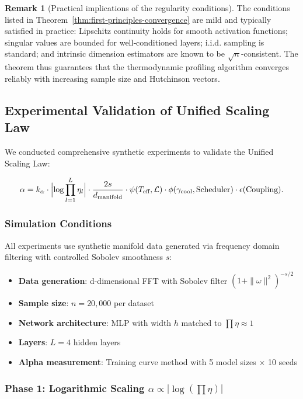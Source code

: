 \documentclass[11pt, a4paper]{article}
\theoremstyle{definition}
\newtheorem{remark}{Remark}[section]
\begin{document}
\begin{remark}[Practical implications of the regularity conditions]
The conditions listed in Theorem~\ref{thm:first-principles-convergence} are mild and typically satisfied in practice: Lipschitz continuity holds for smooth activation functions; singular values are bounded for well‑conditioned layers; i.i.d. sampling is standard; and intrinsic dimension estimators are known to be $\sqrt{n}$‑consistent. The theorem thus guarantees that the thermodynamic profiling algorithm converges reliably with increasing sample size and Hutchinson vectors.
\end{remark}


\subsection{Experimental Validation of Unified Scaling Law}

We conducted comprehensive synthetic experiments to validate the Unified Scaling Law:

\begin{equation}
\alpha = k_\alpha \cdot \Bigl|\log\prod_{l=1}^{L}\eta_l\Bigr| \cdot \frac{2s}{d_{\text{manifold}}} \cdot \psi(T_{\text{eff}},\mathcal{L}) \cdot \phi(\gamma_{\text{cool}},\text{Scheduler}) \cdot \epsilon(\text{Coupling}).
\end{equation}

\subsubsection{Simulation Conditions}

All experiments use synthetic manifold data generated via frequency domain filtering with controlled Sobolev smoothness $s$:
\begin{itemize}
    \item \textbf{Data generation}: d-dimensional FFT with Sobolev filter $(1 + \|\omega\|^2)^{-s/2}$
    \item \textbf{Sample size}: $n = 20{,}000$ per dataset
    \item \textbf{Network architecture}: MLP with width $h$ matched to $\prod\eta \approx 1$
    \item \textbf{Layers}: $L = 4$ hidden layers
    \item \textbf{Alpha measurement}: Training curve method with 5 model sizes $\times$ 10 seeds
\end{itemize}

\subsubsection{Phase 1: Logarithmic Scaling $\alpha \propto |\log(\prod\eta)|$}
\end{document}
